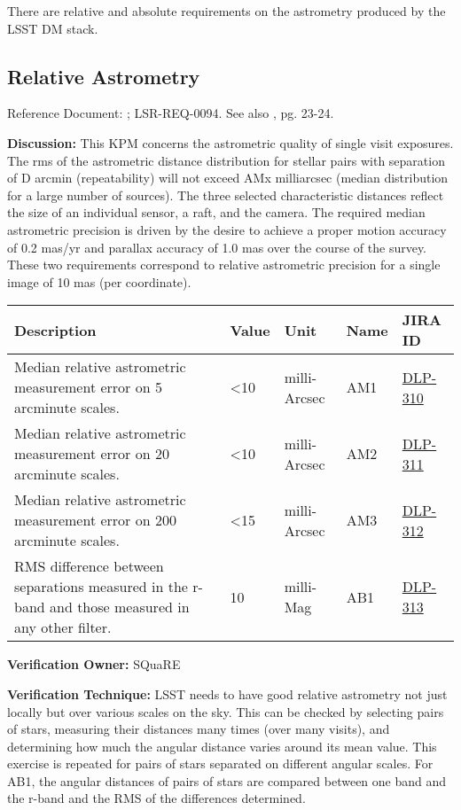 \documentclass[DM,lsstdraft,toc]{lsstdoc}
\newcommand{\jira}[1]{\href{https://jira.lsstcorp.org/browse/#1}{#1}}
\begin{document}
There are relative and absolute requirements on the astrometry produced
by the LSST DM stack.

\subsection{Relative Astrometry}\label{relative-astrometry}

Reference Document: ; LSR-REQ-0094. See also \SRD, pg. 23-24.

\textbf{Discussion:} This KPM concerns the astrometric quality of single
visit exposures. The rms of the astrometric distance distribution for
stellar pairs with separation of D arcmin (repeatability) will not
exceed AMx milliarcsec (median distribution for a large number of
sources). The three selected characteristic distances reflect the size
of an individual sensor, a raft, and the camera. The required median
astrometric precision is driven by the desire to achieve a proper motion
accuracy of 0.2 mas/yr and parallax accuracy of 1.0 mas over the course
of the survey. These two requirements correspond to relative astrometric
precision for a single image of 10 mas (per coordinate).

\begin{longtable}[]{@{}p{}llll@{}}
\toprule
Description & Value & Unit & Name & JIRA ID\tabularnewline
\midrule
\endhead
Median relative astrometric measurement error on 5 arcminute scales. &
\textless{}10 & milli-Arcsec & AM1 & \jira{DLP-310}\tabularnewline
Median relative astrometric measurement error on 20 arcminute scales. &
\textless{}10 & milli-Arcsec & AM2 & \jira{DLP-311}\tabularnewline
Median relative astrometric measurement error on 200 arcminute scales. &
\textless{}15 & milli-Arcsec & AM3 & \jira{DLP-312}\tabularnewline
RMS difference between separations measured in the r-band and those
measured in any other filter. & 10 & milli-Mag & AB1 &
\jira{DLP-313}\tabularnewline
\bottomrule
\end{longtable}

\textbf{Verification Owner:} SQuaRE

\textbf{Verification Technique:} LSST needs to have good relative
astrometry not just locally but over various scales on the sky. This can
be checked by selecting pairs of stars, measuring their distances many
times (over many visits), and determining how much the angular distance
varies around its mean value. This exercise is repeated for pairs of
stars separated on different angular scales. For AB1, the angular
distances of pairs of stars are compared between one band and the r-band
and the RMS of the differences determined.
\end{document}
